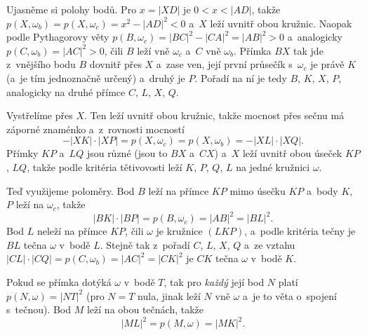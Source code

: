 {    Ujasněme si polohy bodů. Pro $x=|XD|$ je $0 < x < |AD|$, takže $p(X,\omega_b) = p(X,\omega_c) = x^2 - |AD|^2 < 0$ a~$X$ leží uvnitř obou kružnic. Naopak podle Pythagorovy věty $p(B,\omega_c) = |BC|^2 - |CA|^2 = |AB|^2 > 0$ a~analogicky $p(C,\omega_b) = |AC|^2 > 0$, čili $B$ leží vně $\omega_c$ a~$C$ vně $\omega_b$. Přímka $BX$ tak jde z~vnějšího bodu $B$ dovnitř přes $X$ a~zase ven, její první průsečík s~$\omega_c$ je právě $K$ (a~je tím jednoznačně určený) a~druhý je $P$. Pořadí na ní je tedy $B$, $K$, $X$, $P$, analogicky na druhé přímce $C$, $L$, $X$, $Q$.

    Vystřelíme přes $X$. Ten leží uvnitř obou kružnic, takže mocnost přes sečnu má záporné znaménko a~z~rovnosti mocností
    $$
    -|XK| \cdot |XP| = p(X,\omega_c) = p(X,\omega_b) = -|XL| \cdot |XQ|.
    $$
    Přímky $KP$ a~$LQ$ jsou různé (jsou to $BX$ a~$CX$) a~$X$ leží uvnitř obou úseček $KP$, $LQ$, takže podle kritéria tětivovosti leží $K$, $P$, $Q$, $L$ na jedné kružnici $\omega$.

    Teď využijeme poloměry. Bod $B$ leží na přímce $KP$ mimo úsečku $KP$ a~body $K$, $P$ leží na $\omega_c$, takže
    $$
    |BK| \cdot |BP| = p(B,\omega_c) = |AB|^2 = |BL|^2.
    $$
    Bod $L$ neleží na přímce $KP$, čili $\omega$ je kružnice $(LKP)$, a~podle kritéria tečny je $BL$ tečna $\omega$ v~bodě $L$. Stejně tak z~pořadí $C$, $L$, $X$, $Q$ a~ze vztahu $|CL| \cdot |CQ| = p(C,\omega_b) = |AC|^2 = |CK|^2$ je $CK$ tečna $\omega$ v~bodě $K$.

    Pokud se přímka dotýká $\omega$ v~bodě $T$, tak pro \textit{každý} její bod $N$ platí $p(N,\omega) = |NT|^2$ (pro $N=T$ nula, jinak leží $N$ vně $\omega$ a~je to věta o~spojení s~tečnou). Bod $M$ leží na obou tečnách, takže
    $$
    |ML|^2 = p(M,\omega) = |MK|^2.
    $$
}

